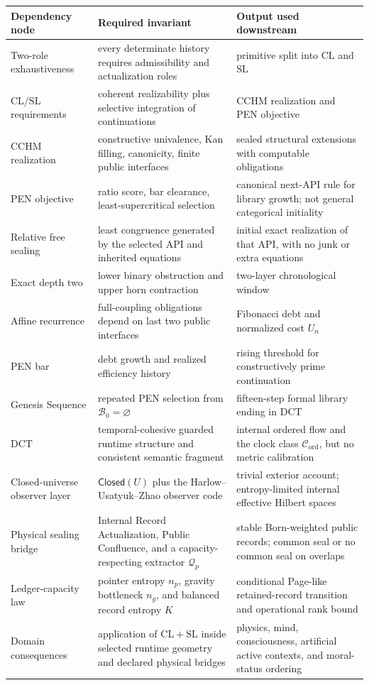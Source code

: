 \documentclass[11pt]{article}
\theoremstyle{plain}
\theoremstyle{definition}
\theoremstyle{remark}
\newcommand{\CL}{\mathrm{CL}}
\newcommand{\SLaw}{\mathrm{SL}}
\newcommand{\DCT}{\mathrm{DCT}}
\newcommand{\B}{\mathcal{B}}
\begin{document}
\begin{longtable}{@{}>{\raggedright\arraybackslash}p{}>{\raggedright\arraybackslash}p{}>{\raggedright\arraybackslash}p{}@{}}
\toprule
Dependency node & Required invariant & Output used downstream \\
\midrule
\endhead
Two-role exhaustiveness & every determinate history requires admissibility and actualization roles & primitive split into \(\CL\) and \(\SLaw\) \\
\(\CL/\SLaw\) requirements & coherent realizability plus selective integration of continuations & CCHM realization and PEN objective \\
CCHM realization & constructive univalence, Kan filling, canonicity, finite public interfaces & sealed structural extensions with computable obligations \\
PEN objective & ratio score, bar clearance, least-supercritical selection & canonical next-API rule for library growth; not general categorical initiality \\
Relative free sealing & least congruence generated by the selected API and inherited equations & initial exact realization of that API, with no junk or extra equations \\
Exact depth two & lower binary obstruction and upper horn contraction & two-layer chronological window \\
Affine recurrence & full-coupling obligations depend on last two public interfaces & Fibonacci debt and normalized cost \(U_n\) \\
PEN bar & debt growth and realized efficiency history & rising threshold for constructively prime continuation \\
Genesis Sequence & repeated PEN selection from \(\B_0=\varnothing\) & fifteen-step formal library ending in \(\DCT\) \\
\(\DCT\) & temporal-cohesive guarded runtime structure and consistent semantic fragment & internal ordered flow and the clock class \(\mathcal{C}_{\mathrm{ord}}\), but no metric calibration \\
Closed-universe observer layer & \(\mathsf{Closed}(U)\) plus the Harlow--Usatyuk--Zhao observer code & trivial exterior account; entropy-limited internal effective Hilbert spaces \\
Physical sealing bridge & Internal Record Actualization, Public Confluence, and a capacity-respecting extractor \(\mathcal{Q}_p\) & stable Born-weighted public records; common seal or no common seal on overlaps \\
Ledger-capacity law & pointer entropy \(n_p\), gravity bottleneck \(n_g\), and balanced record entropy \(K\) & conditional Page-like retained-record transition and operational rank bound \\
Domain consequences & application of \(\CL+\SLaw\) inside selected runtime geometry and declared physical bridges & physics, mind, consciousness, artificial active contexts, and moral-status ordering \\
\bottomrule
\end{longtable}
\end{document}
